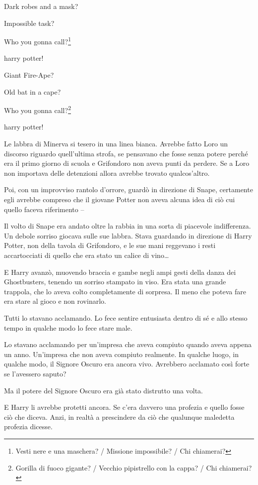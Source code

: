 Dark robes and a mask?

Impossible task?

Who you gonna call?\footnote{Vesti nere e una maschera? / Missione impossibile? / Chi chiamerai?}

harry potter!

Giant Fire-Ape?

Old bat in a cape?

Who you gonna call?\footnote{Gorilla di fuoco gigante? / Vecchio pipistrello con la cappa? / Chi chiamerai?}

harry potter!

Le labbra di Minerva si tesero in una linea bianca. Avrebbe fatto Loro un discorso riguardo quell’ultima strofa, se pensavano che fosse senza potere perché era il primo giorno di scuola e Grifondoro non aveva punti da perdere. Se a Loro non importava delle detenzioni allora avrebbe trovato qualcos’altro.

Poi, con un improvviso rantolo d’orrore, guardò in direzione di Snape, certamente egli avrebbe compreso che il giovane Potter non aveva alcuna idea di ciò cui quello faceva riferimento –

Il volto di Snape era andato oltre la rabbia in una sorta di piacevole indifferenza. Un debole sorriso giocava sulle sue labbra. Stava guardando in direzione di Harry Potter, non della tavola di Grifondoro, e le sue mani reggevano i resti accartocciati di quello che era stato un calice di vino…

E Harry avanzò, muovendo braccia e gambe negli ampi gesti della danza dei Ghostbusters, tenendo un sorriso stampato in viso. Era stata una grande trappola, che lo aveva colto completamente di sorpresa. Il meno che poteva fare era stare al gioco e non rovinarlo.

Tutti lo stavano acclamando. Lo fece sentire entusiasta dentro di sé e allo stesso tempo in qualche modo lo fece stare male.

Lo stavano acclamando per un’impresa che aveva compiuto quando aveva appena un anno. Un’impresa che non aveva compiuto realmente. In qualche luogo, in qualche modo, il Signore Oscuro era ancora vivo. Avrebbero acclamato così forte se l’avessero saputo?

Ma il potere del Signore Oscuro era già stato distrutto una volta.

E Harry li avrebbe protetti ancora. Se c’era davvero una profezia e quello fosse ciò che diceva. Anzi, in realtà a prescindere da ciò che qualunque maledetta profezia dicesse.

